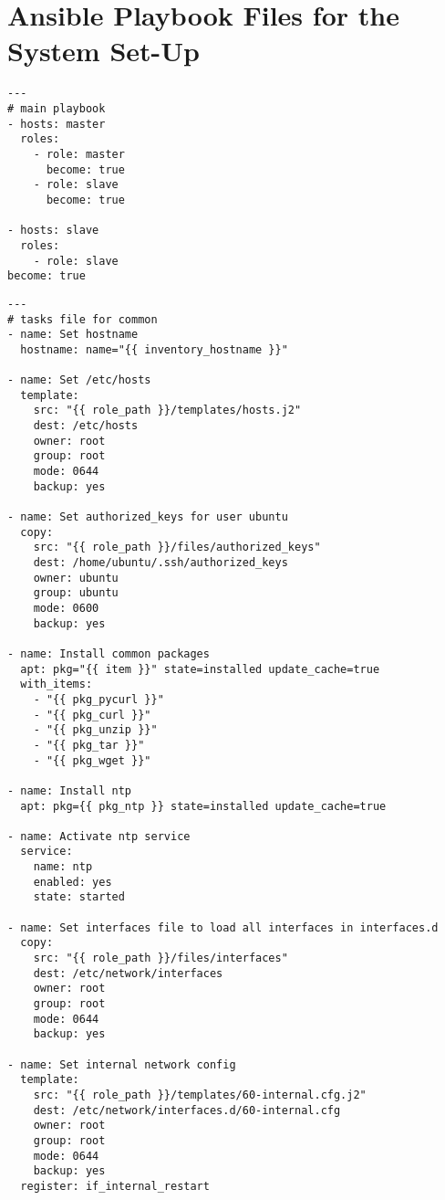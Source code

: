 
\chapter{Ansible Playbook Files for the System Set-Up}
\label{app:ansible}

\lstset{language=sh}
\begin{lstlisting}[caption={Ansible playbook that gets run to install the cluster system}, label={lst:ansibleall}]
---
# main playbook
- hosts: master
  roles:
    - role: master
      become: true
    - role: slave
      become: true

- hosts: slave
  roles:
    - role: slave
become: true
\end{lstlisting}

\lstset{language=sh}
\begin{lstlisting}[caption={Common tasks in Ansible}, label={lst:ansiblecommon}]
---
# tasks file for common
- name: Set hostname
  hostname: name="{{ inventory_hostname }}"

- name: Set /etc/hosts
  template:
    src: "{{ role_path }}/templates/hosts.j2"
    dest: /etc/hosts
    owner: root
    group: root
    mode: 0644
    backup: yes

- name: Set authorized_keys for user ubuntu
  copy:
    src: "{{ role_path }}/files/authorized_keys"
    dest: /home/ubuntu/.ssh/authorized_keys
    owner: ubuntu
    group: ubuntu
    mode: 0600
    backup: yes

- name: Install common packages
  apt: pkg="{{ item }}" state=installed update_cache=true
  with_items:
    - "{{ pkg_pycurl }}"
    - "{{ pkg_curl }}"
    - "{{ pkg_unzip }}"
    - "{{ pkg_tar }}"
    - "{{ pkg_wget }}"

- name: Install ntp
  apt: pkg={{ pkg_ntp }} state=installed update_cache=true

- name: Activate ntp service
  service:
    name: ntp
    enabled: yes
    state: started

- name: Set interfaces file to load all interfaces in interfaces.d
  copy:
    src: "{{ role_path }}/files/interfaces"
    dest: /etc/network/interfaces
    owner: root
    group: root
    mode: 0644
    backup: yes

- name: Set internal network config
  template:
    src: "{{ role_path }}/templates/60-internal.cfg.j2"
    dest: /etc/network/interfaces.d/60-internal.cfg
    owner: root
    group: root
    mode: 0644
    backup: yes
  register: if_internal_restart


\end{lstlisting}
